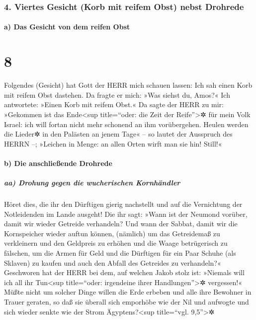 \hypertarget{viertes-gesicht-korb-mit-reifem-obst-nebst-drohrede}{%
\subsubsection{4. Viertes Gesicht (Korb mit reifem Obst) nebst
Drohrede}\label{viertes-gesicht-korb-mit-reifem-obst-nebst-drohrede}}

\hypertarget{a-das-gesicht-von-dem-reifen-obst}{%
\paragraph{a) Das Gesicht von dem reifen
Obst}\label{a-das-gesicht-von-dem-reifen-obst}}

\hypertarget{section-7}{%
\section{8}\label{section-7}}

Folgendes (Gesicht) hat Gott der HERR mich schauen lassen:
Ich sah einen Korb mit reifem Obst dastehen. Da fragte er
mich: »Was siehst du, Amos?« Ich antwortete: »Einen Korb mit reifem
Obst.« Da sagte der HERR zu mir: »Gekommen ist das Ende\textless sup
title=``oder: die Zeit der Reife''\textgreater✲ für mein Volk Israel:
ich will fortan nicht mehr schonend an ihm vorübergehen.
Heulen werden die Lieder✲ in den Palästen an jenem Tage«
-- so lautet der Ausspruch des HERRN --; »Leichen in Menge: an allen
Orten wirft man sie hin! Still!«

\hypertarget{b-die-anschlieuxdfende-drohrede}{%
\paragraph{b) Die anschließende
Drohrede}\label{b-die-anschlieuxdfende-drohrede}}

\hypertarget{aa-drohung-gegen-die-wucherischen-kornhuxe4ndler}{%
\subparagraph{aa) Drohung gegen die wucherischen
Kornhändler}\label{aa-drohung-gegen-die-wucherischen-kornhuxe4ndler}}

Höret dies, die ihr den Dürftigen gierig nachstellt und
auf die Vernichtung der Notleidenden im Lande ausgeht! Die
ihr sagt: »Wann ist der Neumond vorüber, damit wir wieder Getreide
verhandeln? Und wann der Sabbat, damit wir die Kornspeicher wieder
auftun können, (nämlich) um das Getreidemaß zu verkleinern und den
Geldpreis zu erhöhen und die Waage betrügerisch zu fälschen,
um die Armen für Geld und die Dürftigen für ein Paar
Schuhe (als Sklaven) zu kaufen und auch den Abfall des Getreides zu
verhandeln?« Geschworen hat der HERR bei dem, auf welchen
Jakob stolz ist: »Niemals will ich all ihr Tun\textless sup
title=``oder: irgendeine ihrer Handlungen''\textgreater✲ vergessen!«
Müßte nicht um solcher Dinge willen die Erde erbeben und
alle ihre Bewohner in Trauer geraten, so daß sie überall sich emporhöbe
wie der Nil und aufwogte und sich wieder senkte wie der Strom
Ägyptens?\textless sup title=``vgl. 9,5''\textgreater✲

